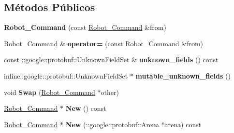 \subsection*{Métodos Públicos}
\begin{DoxyCompactItemize}
\item 
{\bfseries Robot\+\_\+\+Command} (const \hyperlink{classvss__command_1_1Robot__Command}{Robot\+\_\+\+Command} \&from)\hypertarget{classvss__command_1_1Robot__Command_aec1028695262ac9887a661768f2f8bb1}{}\label{classvss__command_1_1Robot__Command_aec1028695262ac9887a661768f2f8bb1}

\item 
\hyperlink{classvss__command_1_1Robot__Command}{Robot\+\_\+\+Command} \& {\bfseries operator=} (const \hyperlink{classvss__command_1_1Robot__Command}{Robot\+\_\+\+Command} \&from)\hypertarget{classvss__command_1_1Robot__Command_afebc3c2ee761027356ce0fabe568ae11}{}\label{classvss__command_1_1Robot__Command_afebc3c2ee761027356ce0fabe568ae11}

\item 
const \+::google\+::protobuf\+::\+Unknown\+Field\+Set \& {\bfseries unknown\+\_\+fields} () const \hypertarget{classvss__command_1_1Robot__Command_a9df4b6bca5721e6b1ae945dc975af2c6}{}\label{classvss__command_1_1Robot__Command_a9df4b6bca5721e6b1ae945dc975af2c6}

\item 
inline\+::google\+::protobuf\+::\+Unknown\+Field\+Set $\ast$ {\bfseries mutable\+\_\+unknown\+\_\+fields} ()\hypertarget{classvss__command_1_1Robot__Command_ac59c88c8dcf9b0e1128e845e238a92d4}{}\label{classvss__command_1_1Robot__Command_ac59c88c8dcf9b0e1128e845e238a92d4}

\item 
void {\bfseries Swap} (\hyperlink{classvss__command_1_1Robot__Command}{Robot\+\_\+\+Command} $\ast$other)\hypertarget{classvss__command_1_1Robot__Command_aab4cd2f4e6d3316f414fa32e7ccf1660}{}\label{classvss__command_1_1Robot__Command_aab4cd2f4e6d3316f414fa32e7ccf1660}

\item 
\hyperlink{classvss__command_1_1Robot__Command}{Robot\+\_\+\+Command} $\ast$ {\bfseries New} () const \hypertarget{classvss__command_1_1Robot__Command_a2a1745c8adfb0fc0fe73449b980ecbee}{}\label{classvss__command_1_1Robot__Command_a2a1745c8adfb0fc0fe73449b980ecbee}

\item 
\hyperlink{classvss__command_1_1Robot__Command}{Robot\+\_\+\+Command} $\ast$ {\bfseries New} (\+::google\+::protobuf\+::\+Arena $\ast$arena) const \hypertarget{classvss__command_1_1Robot__Command_a27964fb97280ed66c14729fec9f545d2}{}\label{classvss__command_1_1Robot__Command_a27964fb97280ed66c14729fec9f545d2}


\end{DoxyCompactItemize}
